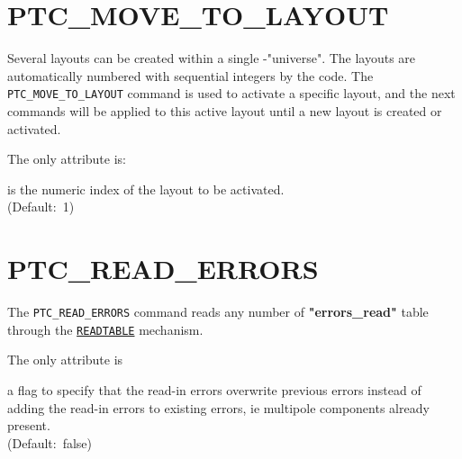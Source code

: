 
\section{PTC\_MOVE\_TO\_LAYOUT}
\label{sec:ptc-move-to-layout}

Several \ptc layouts can be created within a single \ptc-"universe".
The layouts are automatically numbered with sequential integers by the
\madx code. The \texttt{PTC\_MOVE\_TO\_LAYOUT} command is used to
activate a specific layout, and the next \ptc commands will be
applied to this active \ptc layout until a new \ptc layout is created
or activated.


The only attribute is:
\begin{madlist}
	 is the numeric index of the \ptc layout to be
	activated.\\ (Default:~1)
\end{madlist}

\section{PTC\_READ\_ERRORS}
\label{sec:ptc-read-errors}

The \texttt{PTC\_READ\_ERRORS} command reads any number of
\textbf{"errors\_read"} table through the
\hyperref[sec:readtable]{\texttt{READTABLE}} mechanism.


The only attribute is
\begin{madlist}
    a flag to specify that the read-in errors
   overwrite previous errors instead of adding the read-in errors to
   existing errors, ie multipole components already present.\\
   (Default:~false)
\end{madlist}

